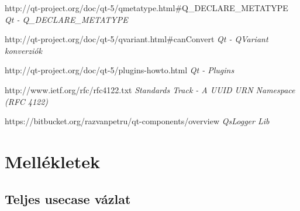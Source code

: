 \documentclass[a4paper,12pt,oneside]{report}
\begin{document}
\begin{thebibliography}{99}
		http://qt-project.org/doc/qt-5/qmetatype.html\#Q\_DECLARE\_METATYPE
        {\em Qt - Q\_DECLARE\_METATYPE}  

		http://qt-project.org/doc/qt-5/qvariant.html\#canConvert
        {\em Qt - QVariant konverziók}  

		http://qt-project.org/doc/qt-5/plugins-howto.html
        {\em Qt - Plugins}  

		http://www.ietf.org/rfc/rfc4122.txt
        {\em Standards Track  - A UUID URN Namespace (RFC 4122) }  
        
		https://bitbucket.org/razvanpetru/qt-components/overview
        {\em QsLogger Lib }  

\end{thebibliography}


\section{Mellékletek}




\subsection{Teljes usecase vázlat}
\label{fig:bimg_usecase_schema_full}

\end{document}
